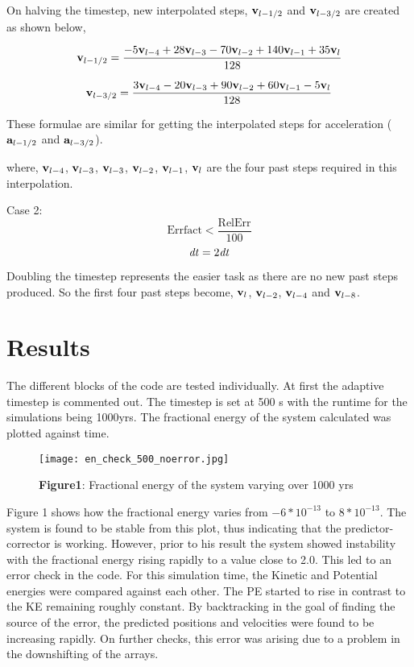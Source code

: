 \documentclass{article}
\begin{document}
{{{On halving the timestep, new interpolated steps, ${\bf v}_{l-{1/2}}$ and ${\bf v}_{l-{3/2}}$ are created as shown below,

\[ {\bf v}_{l-{1/2}} = \frac{-5{\bf v}_{l-4} + 28{\bf v}_{l-3} - 70{\bf v}_{l-2} + 140{\bf v}_{l-1} + 35{\bf v}_l} {128} \]

\[ {\bf v}_{l-{3/2}} = \frac{3{\bf v}_{l-4} - 20{\bf v}_{l-3} + 90{\bf v}_{l-2} + 60{\bf v}_{l-1} - 5{\bf v}_l} {128} \]

These formulae are similar for getting the interpolated steps for acceleration (${\bf a}_{l-{1/2}}$ and ${\bf a}_{l-{3/2}}$). 

where,
${\bf v}_{l-4}$, ${\bf v}_{l-3}$, ${\bf v}_{l-3}$, ${\bf v}_{l-2}$, ${\bf v}_{l-1}$, ${\bf v}_l$ are the four past steps required in this interpolation.

\medskip
Case 2: \[\textrm{Errfact} < \frac{\textrm{RelErr}} {100} \]    \[{\it dt} = 2{\it dt} \]

Doubling the timestep represents the easier task as there are no new past steps produced. So the first four past steps become, ${\bf v}_l$, ${\bf v}_{l-2}$, ${\bf v}_{l-4}$ and ${\bf v}_{l-8}$. }}

\medskip
\section{Results}
{\normalsize{

The different blocks of the code are tested individually. At first the adaptive timestep is commented out. The timestep is set at 500 s with the runtime for the simulations being 1000yrs. The fractional energy of the system calculated was plotted against time.  
\begin{figure} [t]
\texttt{[image: en\_check\_500\_noerror.jpg]}
\centering
\caption{{\bf Figure1}: Fractional energy of the system varying over 1000 yrs}
\end{figure}

Figure 1 shows how the fractional energy varies from $-6*10^{-13}$ to $8*10^{-13}$. The system is found to be stable from this plot, thus indicating that the predictor-corrector is working. However, prior to his result the system showed instability with the fractional energy rising rapidly to a value close to 2.0. This led to an error check in the code. For this simulation time, the Kinetic and Potential energies were compared against each other. The PE started to rise in contrast to the KE remaining roughly constant. By backtracking in the goal of finding the source of the error, the predicted positions and velocities were found to be increasing rapidly. On further checks, this error was arising due to a problem in the downshifting of the arrays. %

}}}
\end{document}
